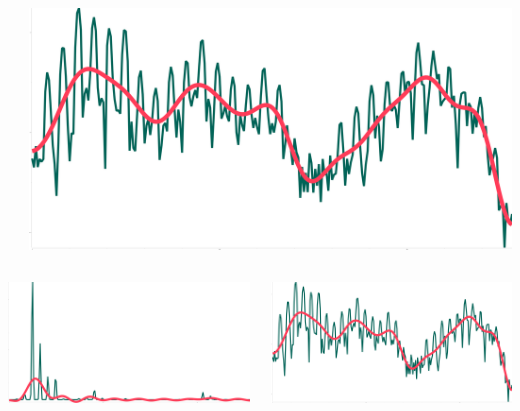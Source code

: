 \documentclass[9pt]{beamer}
\begin{document}
\begin{frame}[t]
\begin{itemize}
{\begin{columns}
\begin{column}{0.48\textwidth}
                    \end{column}
                    \pause
                    \hfill
                    \begin{column}{0.48\textwidth}
                         \includegraphics[width=\textwidth]{aaaa_log.png}
                    \end{column}
                \end{columns}
        }
         {
                \begin{columns}
                    \begin{column}{0.48\textwidth}
                         \includegraphics[width=\textwidth]{aaaa.png}
                    \end{column}
                    \pause
                    \hfill
                    \begin{column}{0.48\textwidth}
                         \includegraphics[width=\textwidth]{aaaa_log.png}

\end{column}
\end{columns}}
\end{itemize}
\end{frame}
\end{document}
